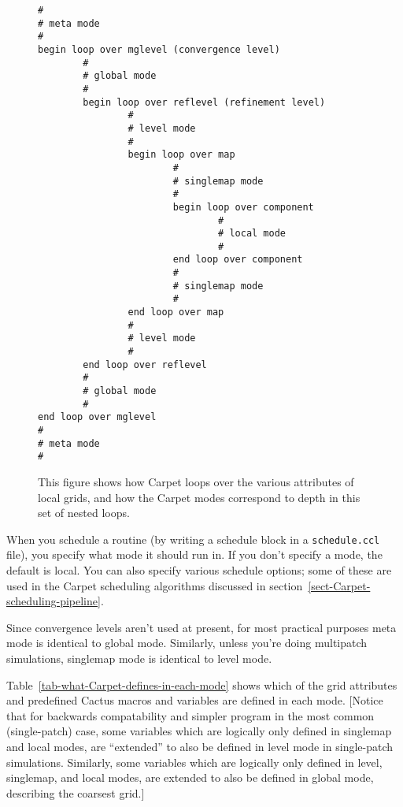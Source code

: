 \documentclass{article}
\begin{document}
\begin{figure}[bp]
\begin{verbatim}
#
# meta mode
#
begin loop over mglevel (convergence level)
        #
        # global mode
        #
        begin loop over reflevel (refinement level)
                #
                # level mode
                #
                begin loop over map
                        #
                        # singlemap mode
                        #
                        begin loop over component
                                #
                                # local mode
                                #
                        end loop over component
                        #
                        # singlemap mode
                        #
                end loop over map
                #
                # level mode
                #
        end loop over reflevel
        #
        # global mode
        #
end loop over mglevel
#
# meta mode
#
\end{verbatim}
\caption[Carpet Loops and Modes]
	{
	This figure shows how Carpet loops over the various
	attributes of local grids, and how the Carpet modes
	correspond to depth in this set of nested loops.
	}
\label{fig-Carpet-loops-and-modes}
\end{figure}

When you schedule a routine (by writing a schedule block in a
\verb|schedule.ccl| file), you specify what mode it should run in.
If you don't specify a mode, the default is local.  You can also
specify various schedule options; some of these are used in the
Carpet scheduling algorithms discussed in
section~\ref{sect-Carpet-scheduling-pipeline}.

Since convergence levels aren't used at present, for most practical
purposes meta mode is identical to global mode.  Similarly, unless
you're doing multipatch simulations, singlemap mode is identical to
level mode.

Table~\ref{tab-what-Carpet-defines-in-each-mode} shows which of the
grid attributes and predefined Cactus macros and variables are defined
in each mode.  [Notice that for backwards compatability and simpler
program in the most common (single-patch) case, some variables which
are logically only defined in singlemap and local modes, are ``extended''
to also be defined in level mode in single-patch simulations.  Similarly,
some variables which are logically only defined in level, singlemap,
and local modes, are extended to also be defined in global mode,
describing the coarsest grid.]
\end{document}

